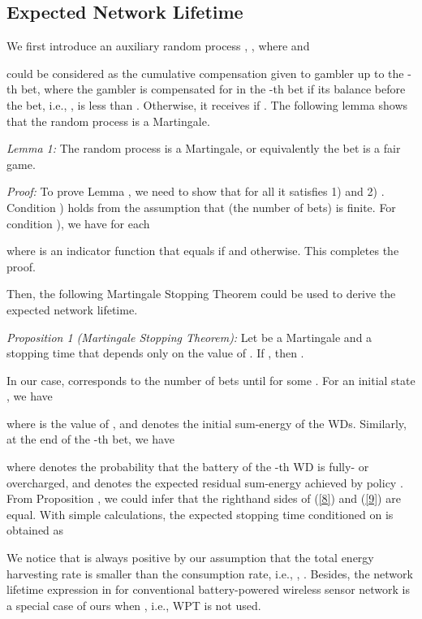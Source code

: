 \documentclass[conference]{IEEEtran}
\begin{document}
\subsection{Expected Network Lifetime}
We first introduce an auxiliary random process , , where  and

 could be considered as the cumulative compensation given to gambler  up to the -th bet, where the gambler is compensated for  in the -th bet if its balance before the bet, i.e., , is less than . Otherwise, it receives  if . The following lemma shows that the random process  is a Martingale.

\emph{Lemma 1:} The random process  is a Martingale, or equivalently the bet is a fair game.

\emph{Proof:} To prove Lemma , we need to show that for all  it satisfies 1)  and 2)  \cite{2001:Grimmett}. Condition ) holds from the assumption that  (the number of bets) is finite. For condition ), we have for each 

where  is an indicator function that equals  if  and  otherwise. This completes the proof.  

Then, the following Martingale Stopping Theorem \cite{2001:Grimmett} could be used to derive the expected network lifetime.

\emph{Proposition 1 (Martingale Stopping Theorem):} Let  be a Martingale and  a stopping time that depends only on the value of . If , then .

In our case,  corresponds to the number of bets until  for some . For an initial state , we have

where  is the value of , and  denotes the initial sum-energy of the WDs. Similarly, at the end of the -th bet, we have

where  denotes the probability that the battery of the -th WD is fully- or overcharged, and  denotes the expected residual sum-energy achieved by policy . From Proposition , we could infer that the righthand sides of (\ref{8}) and (\ref{9}) are equal. With simple calculations, the expected stopping time conditioned on  is obtained as

We notice that  is always positive by our assumption that the total energy harvesting rate is smaller than the consumption rate, i.e., , . Besides, the network lifetime expression in \cite{2007:Chen} for conventional battery-powered wireless sensor network is a special case of ours when , i.e., WPT is not used.
\end{document}
